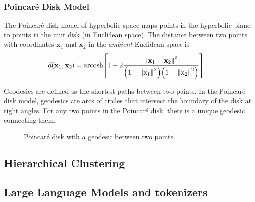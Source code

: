 \documentclass{article}
\begin{document}
\subsubsection{Poincaré Disk Model}

The Poincaré disk model of hyperbolic space maps points in the hyperbolic plane to points in the unit disk (in Euclidean space). The distance between two points with coordinates $\mathbf x_1$ and $\mathbf x_2$ in the \emph{ambient} Euclidean space is
\begin{align}
  d(\mathbf x_1, \mathbf x_2)
  = \text{arcosh} \qty[1 + 2 \frac{\norm{\mathbf x_1 - \mathbf x_2}^2}{\qty(1 - \norm{\mathbf x_1}^2) \qty(1 - \norm{\mathbf x_2}^2)}] \; . \label{eq:poincare-distance}
\end{align}

Geodesics are defined as the shortest paths between two points. In the Poincaré disk model, geodesics are arcs of circles that intersect the boundary of the disk at right angles. For any two points in the Poincaré disk, there is a unique geodesic connecting them.

\begin{figure}[ht]
  \centering
  \caption{Poincaré disk with a geodesic between two points.}
  \label{fig:poincare-disk}
\end{figure}

\subsection{Hierarchical Clustering}


\subsection{Large Language Models and tokenizers}
\end{document}
